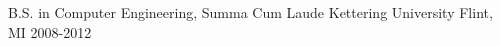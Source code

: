 

\begin{cventries}

  \cventry
    {B.S. in Computer Engineering, Summa Cum Laude} %
    {Kettering University} %
    {Flint, MI} %
    {2008-2012} %
    {
    }

\end{cventries}
